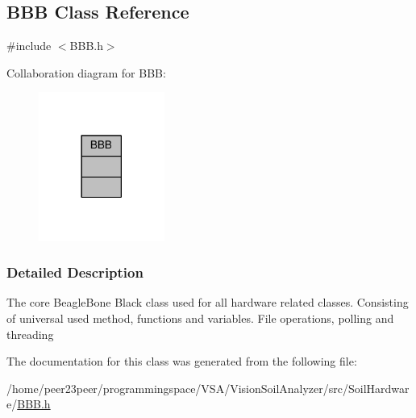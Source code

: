 \hypertarget{class_b_b_b}{}\subsection{B\+B\+B Class Reference}
\label{class_b_b_b}


{\ttfamily \#include $<$B\+B\+B.\+h$>$}



Collaboration diagram for B\+B\+B\+:
\nopagebreak
\begin{figure}[H]
\begin{center}
\leavevmode
\includegraphics[width=117pt]{class_b_b_b__coll__graph}
\end{center}
\end{figure}


\subsubsection{Detailed Description}
The core Beagle\+Bone Black class used for all hardware related classes. Consisting of universal used method, functions and variables. File operations, polling and threading 

The documentation for this class was generated from the following file\+:\begin{DoxyCompactItemize}
\item 
/home/peer23peer/programmingspace/\+V\+S\+A/\+Vision\+Soil\+Analyzer/src/\+Soil\+Hardware/\hyperlink{_b_b_b_8h}{B\+B\+B.\+h}\end{DoxyCompactItemize}
